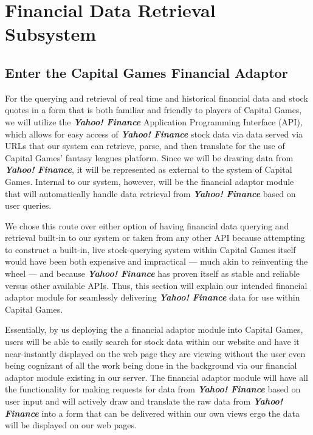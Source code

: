 \section{Financial Data Retrieval Subsystem}

\subsection{Enter the Capital Games Financial Adaptor}

For the querying and retrieval of real time and historical financial data and stock quotes in a form that is both familiar and friendly to players of Capital Games, we will utilize the {\textit{\textbf{Yahoo! Finance}}} Application Programming Interface (API), which allows for easy access of {\textit{\textbf{Yahoo! Finance}}} stock data via data served via URLs that our system can retrieve, parse, and then translate for the use of Capital Games’ fantasy leagues platform. Since we will be drawing data from {\textit{\textbf{Yahoo! Finance}}}, it will be represented as external to the system of Capital Games. Internal to our system, however, will be the financial adaptor module that will automatically handle data retrieval from {\textit{\textbf{Yahoo! Finance}}} based on user queries.  

We chose this route over either option of having financial data querying and retrieval built-in to our system or taken from any other API because attempting to construct a built-in, live stock-querying system within Capital Games itself would have been both expensive and impractical --- much akin to reinventing the wheel --- and because {\textit{\textbf{Yahoo! Finance}}} has proven itself as stable and reliable versus other available APIs. Thus, this section will explain our intended financial adaptor module for seamlessly delivering {\textit{\textbf{Yahoo! Finance}}} data for use within Capital Games.

Essentially, by us deploying the a financial adaptor module into Capital Games, users will be able to easily search for stock data within our website and have it near-instantly displayed on the web page they are viewing without the user even being cognizant of all the work being done in the background via our financial adaptor module existing in our server. The financial adaptor module will have all the functionality for making requests for data from {\textit{\textbf{Yahoo! Finance}}} based on user input and will actively draw and translate the raw data from {\textit{\textbf{Yahoo! Finance}}} into a form that can be delivered within our own views ergo the data will be displayed on our web pages.

